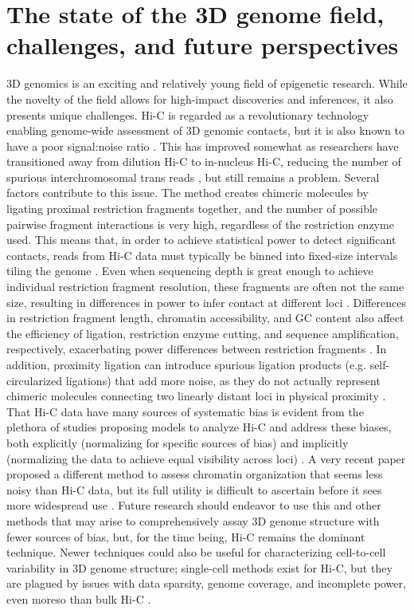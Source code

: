 \section{The state of the 3D genome field, challenges, and future perspectives}
3D genomics is an exciting and relatively young field of epigenetic research. While the novelty of the field allows for high-impact discoveries and inferences, it also presents unique challenges. Hi-C is regarded as a revolutionary technology enabling genome-wide assessment of 3D genomic contacts, but it is also known to have a poor signal:noise ratio \cite{Lajoie.2015, Yardımcı.2019}. This has improved somewhat as researchers have transitioned away from dilution Hi-C to in-nucleus Hi-C, reducing the number of spurious interchromosomal trans reads \cite{Nagano.2015}, but still remains a problem. Several factors contribute to this issue. The method creates chimeric molecules by ligating proximal restriction fragments together, and the number of possible pairwise fragment interactions is very high, regardless of the restriction enzyme used. This means that, in order to achieve statistical power to detect significant contacts, reads from Hi-C data must typically be binned into fixed-size intervals tiling the genome \cite{Pal.2019}. Even when sequencing depth is great enough to achieve individual restriction fragment resolution, these fragments are often not the same size, resulting in differences in power to infer contact at different loci \cite{Yaffe.2011}. Differences in restriction fragment length, chromatin accessibility, and GC content also affect the efficiency of ligation, restriction enzyme cutting, and sequence amplification, respectively, exacerbating power differences between restriction fragments \cite{Yaffe.2011}. In addition, proximity ligation can introduce spurious ligation products (e.g. self-circularized ligations) that add more noise, as they do not actually represent chimeric molecules connecting two linearly distant loci in physical proximity \cite{Belaghzal.2017}. That Hi-C data have many sources of systematic bias is evident from the plethora of studies proposing models to analyze Hi-C and address these biases, both explicitly (normalizing for specific sources of bias) and implicitly (normalizing the data to achieve equal visibility across loci) \cite{Yaffe.2011, Hu.2012, Imakaev.2012, Rao.2014, Cournac.2012, Knight.2012, Lin.2012, Stansfield.2018, Wingett.2015, Servant.2015, Sauria.2015}. A very recent paper proposed a different method to assess chromatin organization that seems less noisy than Hi-C data, but its full utility is difficult to ascertain before it sees more widespread use \cite{You.2020}. Future research should endeavor to use this and other methods that may arise to comprehensively assay 3D genome structure with fewer sources of bias, but, for the time being, Hi-C remains the dominant technique. Newer techniques could also be useful for characterizing cell-to-cell variability in 3D genome structure; single-cell methods exist for Hi-C, but they are plagued by issues with data sparsity, genome coverage, and incomplete power, even moreso than bulk Hi-C \cite{Ramani.2017rm, Ramani.2019, Nagano.2013, Nagano.2015ih5, Zhou.2019gy}.

